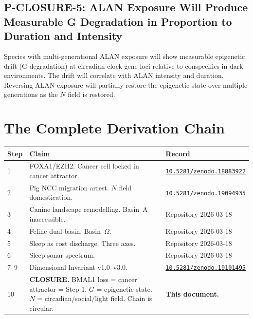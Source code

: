 \documentclass[10pt, a4paper]{article}
\begin{document}
\subsection{P-CLOSURE-5: ALAN Exposure
Will Produce Measurable G Degradation
in Proportion to Duration and Intensity}

Species with multi-generational ALAN
exposure will show measurable epigenetic
drift (G degradation) at circadian clock
gene loci relative to conspecifics in
dark environments. The drift will
correlate with ALAN intensity and
duration. Reversing ALAN exposure will
partially restore the epigenetic state
over multiple generations as the $N$
field is restored.

\section{The Complete Derivation Chain}
\label{sec:chain}

\begin{center}
\small
\begin{tabular}{p{1.0cm}p{4.5cm}p{6.5cm}}
\toprule
\textbf{Step} & \textbf{Claim} &
\textbf{Record}\\
\midrule
1 & FOXA1/EZH2. Cancer cell locked in
cancer attractor. &
\href{https://doi.org/10.5281/zenodo.18883922}
{\texttt{10.5281/zenodo.18883922}}\\[0.3em]
2 & Pig NCC migration arrest.
$N$ field domestication. &
\href{https://doi.org/10.5281/zenodo.19094935}
{\texttt{10.5281/zenodo.19094935}}\\[0.3em]
3 & Canine landscape remodelling.
Basin~A inaccessible. &
Repository 2026-03-18\\[0.3em]
4 & Feline dual-basin.
Basin~$\Omega$. &
Repository 2026-03-18\\[0.3em]
5 & Sleep as cost discharge.
Three axes. &
Repository 2026-03-18\\[0.3em]
6 & Sleep sonar spectrum. &
Repository 2026-03-18\\[0.3em]
7--9 & Dimensional Invariant
v1.0--v3.0. &
\href{https://doi.org/10.5281/zenodo.19101495}
{\texttt{10.5281/zenodo.19101495}}\\[0.3em]
10 & \textbf{CLOSURE.} BMAL1 loss
= cancer attractor = Step 1.
$G$ = epigenetic state.
$N$ = circadian/social/light field.
Chain is circular. &
\textbf{This document.}\\
\bottomrule
\end{tabular}
\end{center}
\end{document}
